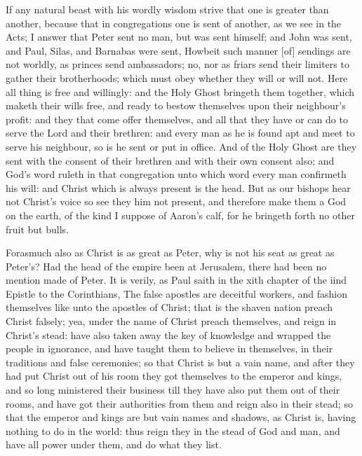 If any natural beast with his wordly wisdom strive that 
one is greater than another, because that in congregations 
one is sent of another, as we see in the Acts; I answer 
that Peter sent no man, but was sent himself; and John 
was sent, and Paul, Silas, and Barnabas were sent, 
Howbeit such manner [of] sendings are not worldly, as 
princes send ambassadors; no, nor as friars send their limiters
to gather their brotherhoods; which must obey 
whether they will or will not. Here all thing is free and willingly:
and the Holy Ghost bringeth them together, which 
maketh their wills free, and ready to bestow themselves upon
their neighbour's profit: and they that come offer themselves,
and all that they have or can do to serve the Lord 
and their brethren: and every man as he is found apt and 
meet to serve his neighbour, so is he sent or put in office. 
And of the Holy Ghost are they sent with the consent of 
their brethren and with their own consent also; and God's 
word ruleth in that congregation unto which word every 
man confirmeth his will: and Christ which is always present 
is the head. But as our bishops hear not Christ's voice 
so see they him not present, and therefore make them a 
God on the earth, of the kind I suppose of Aaron's calf, 
for he bringeth forth no other fruit but bulls. 

Forasmuch also as Christ is as great as Peter, why is 
not his seat as great as Peter's? Had the head of the empire
been at Jerusalem, there had been no mention made of 
Peter. It is verily, as Paul saith in the xith chapter of the 
iind Epistle to the Corinthians, The false apostles are deceitful
workers, and fashion themselves like unto the 
apostles of Christ; that is the shaven nation preach Christ 
falsely; yea, under the name of Christ preach themselves,
and reign in Christ's stead: have also taken away 
the key of knowledge and wrapped the people in ignorance, 
and have taught them to believe in themselves, in their traditions
and false ceremonies; so that Christ is but a vain
name, and after they had put Christ out of his room they
got themselves to the emperor and kings, and so long ministered
their business till they have also put them out of 
their rooms, and have got their authorities from them and
reign also in their stead; so that the emperor and kings are 
but vain names and shadows, as Christ is, having nothing to 
do in the world: thus reign they in the stead of God and 
man, and have all power under them, and do what they 
list.

